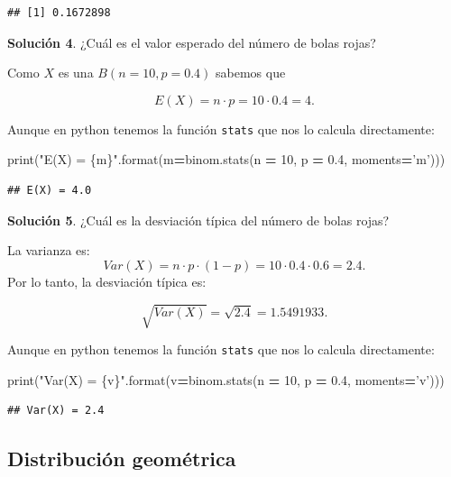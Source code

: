 \documentclass[]{book}
\newenvironment{Shaded}{\begin{snugshade}}{\end{snugshade}}
\newcommand{\BuiltInTok}[1]{#1}
\newcommand{\DecValTok}[1]{\textcolor[rgb]{0.00,0.00,0.81}{#1}}
\newcommand{\FloatTok}[1]{\textcolor[rgb]{0.00,0.00,0.81}{#1}}
\newcommand{\NormalTok}[1]{#1}
\newcommand{\OperatorTok}[1]{\textcolor[rgb]{0.81,0.36,0.00}{\textbf{#1}}}
\newcommand{\SpecialCharTok}[1]{\textcolor[rgb]{0.00,0.00,0.00}{#1}}
\newcommand{\StringTok}[1]{\textcolor[rgb]{0.31,0.60,0.02}{#1}}
\begin{document}
\begin{verbatim}
## [1] 0.1672898
\end{verbatim}

\textbf{Solución 4}. ¿Cuál es el valor esperado del número de bolas rojas?

Como \(X\) es una \(B(n=10,p=0.4)\) sabemos que

\[E(X)=n\cdot p = 10\cdot 0.4=4.\]

Aunque en python tenemos la función \texttt{stats} que nos lo calcula directamente:

\begin{Shaded}
\begin{Highlighting}[]
\BuiltInTok{print}\NormalTok{(}\StringTok{"E(X) = }\SpecialCharTok{\{m\}}\StringTok{"}\NormalTok{.}\BuiltInTok{format}\NormalTok{(m}\OperatorTok{=}\NormalTok{binom.stats(n }\OperatorTok{=} \DecValTok{10}\NormalTok{, p }\OperatorTok{=} \FloatTok{0.4}\NormalTok{, moments}\OperatorTok{=}\StringTok{'m'}\NormalTok{)))}
\end{Highlighting}
\end{Shaded}

\begin{verbatim}
## E(X) = 4.0
\end{verbatim}

\textbf{Solución 5}. ¿Cuál es la desviación típica del número de bolas rojas?

La varianza es:
\[
Var(X)=n\cdot p \cdot(1-p)=10\cdot 0.4\cdot 0.6=2.4.
\]
Por lo tanto, la desviación típica es:

\[\sqrt{Var(X)}=\sqrt{2.4}= 1.5491933.\]

Aunque en python tenemos la función \texttt{stats} que nos lo calcula directamente:

\begin{Shaded}
\begin{Highlighting}[]
\BuiltInTok{print}\NormalTok{(}\StringTok{"Var(X) = }\SpecialCharTok{\{v\}}\StringTok{"}\NormalTok{.}\BuiltInTok{format}\NormalTok{(v}\OperatorTok{=}\NormalTok{binom.stats(n }\OperatorTok{=} \DecValTok{10}\NormalTok{, p }\OperatorTok{=} \FloatTok{0.4}\NormalTok{, moments}\OperatorTok{=}\StringTok{'v'}\NormalTok{)))}
\end{Highlighting}
\end{Shaded}

\begin{verbatim}
## Var(X) = 2.4
\end{verbatim}

\hypertarget{distribuciuxf3n-geomuxe9trica}{%
\subsection{Distribución geométrica}\label{distribuciuxf3n-geomuxe9trica}}
\end{document}
